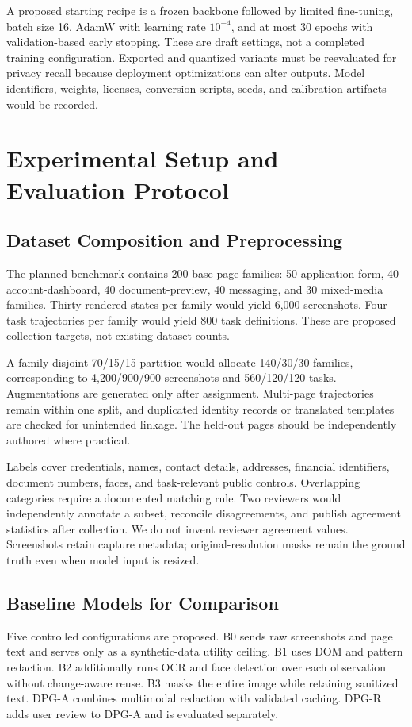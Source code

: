 \documentclass[conference]{IEEEtran}
\begin{document}
A proposed starting recipe is a frozen backbone followed by limited fine-tuning, batch size 16, AdamW with learning rate $10^{-4}$, and at most 30 epochs with validation-based early stopping. These are draft settings, not a completed training configuration. Exported and quantized variants must be reevaluated for privacy recall because deployment optimizations can alter outputs. Model identifiers, weights, licenses, conversion scripts, seeds, and calibration artifacts would be recorded.



\section{Experimental Setup and Evaluation Protocol}
\subsection{Dataset Composition and Preprocessing}
The planned benchmark contains 200 base page families: 50 application-form, 40 account-dashboard, 40 document-preview, 40 messaging, and 30 mixed-media families. Thirty rendered states per family would yield 6,000 screenshots. Four task trajectories per family would yield 800 task definitions. These are proposed collection targets, not existing dataset counts.

A family-disjoint 70/15/15 partition would allocate 140/30/30 families, corresponding to 4,200/900/900 screenshots and 560/120/120 tasks. Augmentations are generated only after assignment. Multi-page trajectories remain within one split, and duplicated identity records or translated templates are checked for unintended linkage. The held-out pages should be independently authored where practical.

Labels cover credentials, names, contact details, addresses, financial identifiers, document numbers, faces, and task-relevant public controls. Overlapping categories require a documented matching rule. Two reviewers would independently annotate a subset, reconcile disagreements, and publish agreement statistics after collection. We do not invent reviewer agreement values. Screenshots retain capture metadata; original-resolution masks remain the ground truth even when model input is resized.

\subsection{Baseline Models for Comparison}
Five controlled configurations are proposed. B0 sends raw screenshots and page text and serves only as a synthetic-data utility ceiling. B1 uses DOM and pattern redaction. B2 additionally runs OCR and face detection over each observation without change-aware reuse. B3 masks the entire image while retaining sanitized text. DPG-A combines multimodal redaction with validated caching. DPG-R adds user review to DPG-A and is evaluated separately.
\end{document}
